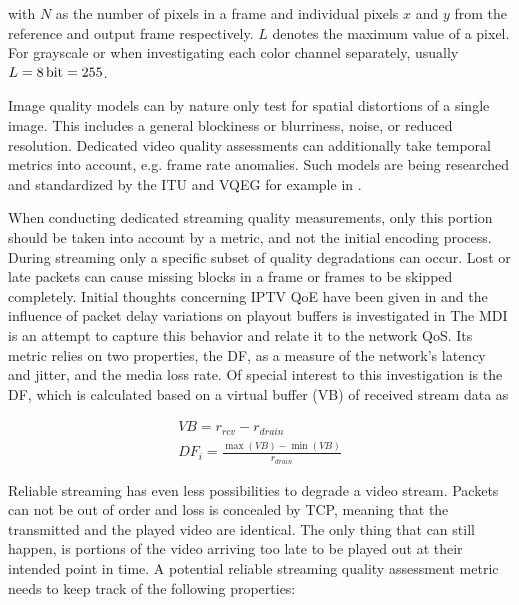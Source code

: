 with $N$ as the number of pixels in a frame and individual pixels $x$ and $y$ from the reference and output frame respectively. $L$ denotes the maximum value of a pixel. For grayscale or when investigating each color channel separately, usually $L = \SI{8}{\bit} = 255$.  \cite{objective-vqa}

Image quality models can by nature only test for spatial distortions of a single image. This includes a general blockiness or blurriness, noise, or reduced resolution. Dedicated video quality assessments can additionally take temporal metrics into account, e.g. frame rate anomalies. Such models are being researched and standardized by the \gls{ITU} and \gls{VQEG} for example in \cite{ituJ144, ituJ246, ituJ247}.


When conducting dedicated streaming quality measurements, only this portion should be taken into account by a metric, and not the initial encoding process. During streaming only a specific subset of quality degradations can occur. Lost or late packets can cause missing blocks in a frame or frames to be skipped completely. Initial thoughts concerning \gls{IPTV} \gls{QoE} have been given in \cite{ituG1080} and the influence of packet delay variations on playout buffers is investigated in \cite{rfc3393}The \gls{MDI} \cite{rfc4445} is an attempt to capture this behavior and relate it to the network \gls{QoS}. Its metric relies on two properties, the \gls{DF}, as a measure of the network's latency and jitter, and the media loss rate. Of special interest to this investigation is the \gls{DF}, which is calculated based on a virtual buffer (VB) of received stream data as

\begin{equation}
    \begin{aligned}
        VB = r_{rcv} - r_{drain} \\
        DF_i = \frac{\max(VB) - \min(VB)}{r_{drain}}
    \end{aligned}
\end{equation}
 
Reliable streaming has even less possibilities to degrade a video stream. Packets can not be out of order and loss is concealed by \gls{TCP}, meaning that the transmitted and the played video are identical. The only thing that can still happen, is portions of the video arriving too late to be played out at their intended point in time.
A potential reliable streaming quality assessment metric needs to keep track of the following properties:

